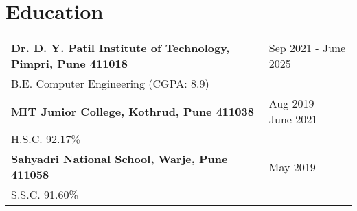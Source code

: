 \documentclass[a4paper,10pt]{article}
\makeatletter
\newenvironment{jobshort}[2]
    {
    \begin{tabularx}{\linewidth}{@{}l X r@{}}
    \textbf{#1} & \hfill &  #2 \\[3.75pt]
    \end{tabularx}
    }
    {
    }
\newenvironment{joblong}[2]
    {
    \begin{tabularx}{\linewidth}{@{}l X r@{}}
    \textbf{#1} & \hfill &  #2 \\[3.75pt]
    \end{tabularx}
    \begin{minipage}[t]{\linewidth}
    \begin{itemize}[nosep,after=\strut, leftmargin=1em, itemsep=3pt,label=--]
    }
    {
    \end{itemize}
    \end{minipage}    
    }
\makeatother
\begin{document}
\section{Education}
\begin{tabularx}{\linewidth}{@{}l X@{}}	

\textbf{Dr. D. Y. Patil Institute of Technology, Pimpri, Pune 411018} & \hfill 
Sep 2021 - June 2025 \\ \vspace*{2mm} 
B.E. Computer Engineering (CGPA: 8.9)\\ 

\textbf{MIT Junior College, Kothrud, Pune 411038} & \hfill 
Aug 2019 - June 2021 \\ \vspace*{2mm}
H.S.C. 92.17\% \\ 

\textbf{Sahyadri National School, Warje, Pune 411058} & \hfill 
May 2019 \\ 
S.S.C. 91.60\% \\

\end{tabularx}




\end{document}
